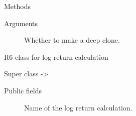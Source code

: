 \documentclass[a4paper]{book}
\begin{document}
\begin{Section}{Methods}
\begin{SubSection}{}

%
\begin{SubSubSection}{Arguments}

\begin{description}

\item[] Whether to make a deep clone.

\end{description}



\end{SubSubSection}

\end{SubSection}


\end{Section}
%
\begin{Description}
R6 class for log return calculation
\end{Description}
%
\begin{Section}{Super class}
 -> 
\end{Section}
%
\begin{Section}{Public fields}

\begin{description}

\item[] Name of the log return calculation.

\end{description}


\end{Section}
%
\end{document}
